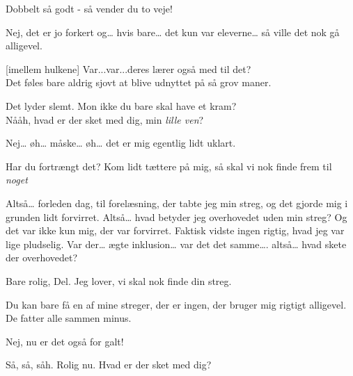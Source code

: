 \documentclass[a4paper,11pt]{article}
\begin{document}
\begin{sketch}
  Dobbelt så godt - så vender du to veje! 

  Nej, det er jo forkert og… hvis bare… det kun var eleverne… så ville det nok gå alligevel. 

\says{=}[imellem hulkene] Var...var...deres lærer også med til det? \\
Det føles bare aldrig sjovt at blive udnyttet på så grov maner. 


 Det lyder slemt. Mon ikke du bare skal have et kram?  \\ 
Nååh, hvad er der sket med dig, min \textit{lille ven}?  

 Nej… øh… måske… øh… det er mig egentlig lidt uklart.

 Har du fortrængt det? Kom lidt tættere på mig, så skal vi nok finde frem til \emph{noget}  

 Altså… forleden dag, til forelæsning, der tabte jeg min streg, og det gjorde mig i grunden lidt forvirret. Altså… hvad betyder jeg overhovedet uden min streg? Og det var ikke kun mig, der var forvirret. Faktisk vidste ingen rigtig, hvad jeg var lige pludselig. Var der… ægte inklusion… var det det samme…. altså… hvad skete der overhovedet?

 Bare rolig, Del. Jeg lover, vi skal nok finde din streg.

\says{=} Du kan bare få en af mine streger, der er ingen, der bruger mig rigtigt alligevel. De fatter alle sammen minus. 



 Nej, nu er det også for galt!

 Så, så, såh. Rolig nu. Hvad er der sket med dig?


\end{sketch}
\end{document}

